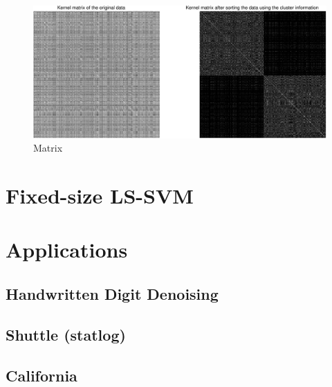 \documentclass[11pt, a4paper]{article}
\begin{document}
\begin{figure}[H]
  \centering
  \includegraphics[scale=.40]{scluster_matrix.pdf}
  \caption{Matrix}
  \label{fig:sclustering_matrix}
\end{figure}

\section{Fixed-size LS-SVM}

\section{Applications}

\subsection{Handwritten Digit Denoising}

\subsection{Shuttle (statlog)}

\subsection{California}

% 
\end{document}
